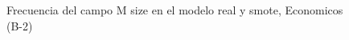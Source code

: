 \begin{figure}[H]
    \centering
    
    \caption{Frecuencia del campo M size en el modelo real y smote, Economicos (B-2)}
    \label{frecuency-M Size-smote-enc}
\end{figure}